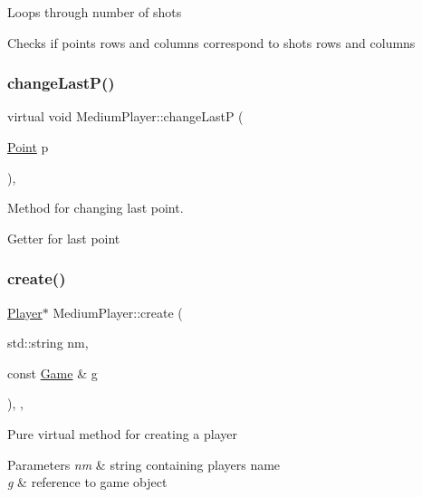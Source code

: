 Loops through number of shots

Checks if point\textquotesingle{}s rows and columns correspond to shot\textquotesingle{}s rows and columns \mbox{\label{class_medium_player_afc952f7dac91d979743154c021d8dee8}} 
\subsubsection{\texorpdfstring{change\+Last\+P()}{changeLastP()}}
{\footnotesize\ttfamily virtual void Medium\+Player\+::change\+LastP (\begin{DoxyParamCaption}\item[{\mbox{\hyperlink{class_point}{Point}}}]{p }\end{DoxyParamCaption})\hspace{0.3cm}{\ttfamily [inline]}, {\ttfamily [virtual]}}



Method for changing last point. 

Getter for last point \mbox{\label{class_medium_player_a7a681c6bebf67740d1919339bd423ac5}} 
\subsubsection{\texorpdfstring{create()}{create()}}
{\footnotesize\ttfamily \mbox{\hyperlink{class_player}{Player}}$\ast$ Medium\+Player\+::create (\begin{DoxyParamCaption}\item[{std\+::string}]{nm,  }\item[{const \mbox{\hyperlink{class_game}{Game}} \&}]{g }\end{DoxyParamCaption})\hspace{0.3cm}{\ttfamily [inline]}, {\ttfamily [override]}, {\ttfamily [virtual]}}

Pure virtual method for creating a player 
\begin{DoxyParams}{Parameters}
{\em nm} & string containing player\textquotesingle{}s name \\
\hline
{\em g} & reference to game object \\
\hline
\end{DoxyParams}


